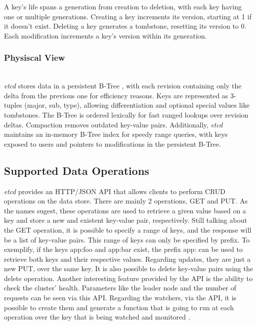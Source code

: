 \documentclass[screen,review]{acmart}
\begin{document}
A key's life spans a generation from creation to deletion, with each key having one or multiple generations. Creating a key increments its version, starting at 1 if it doesn't exist. Deleting a key generates a tombstone, resetting its version to 0. Each modification increments a key's version within its generation. \\

\subsubsection{Physiscal View}~\\
\textit{etcd} stores data in a persistent B-Tree \cite{b-tree}, with each revision containing only the delta from the previous one for efficiency reasons. Keys are represented as 3-tuples (major, sub, type), allowing differentiation and optional special values like tombstones. The B-Tree is ordered lexically for fast ranged lookups over revision deltas. Compaction removes outdated key-value pairs. Additionally, \textit{etcd} maintains an in-memory B-Tree index for speedy range queries, with keys exposed to users and pointers to modifications in the persistent B-Tree.

\subsection{Supported Data Operations}
\textit{etcd} provides an HTTP/JSON API \cite{etcd_api} that allows clients to perform CRUD operations \cite{crud} on the data store.
There are mainly 2 operations, GET and PUT. As the names sugest, these operations are used to retrieve a given value based on a key and store a new and existent key-value pair, respectively.
Still talking about the GET operation, it is possible to specify a range of keys, and the response will be a list of key-value pairs. This range of keys can only be specified by prefix. To exemplify, if the keys app:foo and app:bar exist, the prefix app: can be used to retrieve both keys and their respective values.
Regarding updates, they are just a new PUT, over the same key.
It is also possible to delete key-value pairs using the delete operation.
Another interesting feature provided by the API is the ability to check the cluster' health. Parameters like the leader node and the number of requests can be seen via this API.
Regarding the watchers, via the API, it is possible to create them and generate a function that is going to run at each operation over the key that is being watched and monitored \cite{etcd_api}.
\end{document}
